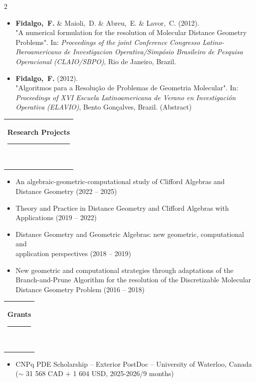 \documentclass[10pt,A4,english]{article}
\newcommand{\mpwidth}{\linewidth-\fboxsep-\fboxsep}
\newcommand{\cvtext}[1] {
	\begin{tabular*}{1\mpwidth}{p{1.05\mpwidth}}
		\parbox{1\mpwidth}{#1}
	\end{tabular*}
}
\newcommand{\cvsection}[1] {
	\vspace{14pt}
	\cvtext{
		\textbf{\LARGE{\textcolor{darkcol}{#1}}}\\[-4pt]
		\textcolor{accentcol}{ \rule{0.2\textwidth}{1.5pt} } \\
	}
}
\begin{document}
\begin{paracol}{2}
\begin{rightcolumn}
\begin{itemize}[leftmargin=*]
%
\\[5pt]
%
\item \textbf{Fidalgo,~F.} \& Maioli,~D. \& Abreu,~E. \& Lavor,~C. (2012). \\ "A numerical formulation for the resolution of Molecular Distance Geometry Problems". In: \textit{Proceedings of the joint Conference Congresso Latino-Iberoamericano de Investigacion Operativa/Simpósio Brasileiro de Pesquisa Operacional (CLAIO/SBPO)}, Rio de Janeiro, Brazil.
%
\\[5pt]
%
\item \textbf{Fidalgo,~F.} (2012). \\ "Algoritmos para a Resolução de Problemas de Geometria Molecular". In: \textit{Proceedings of XVI Escuela Latinoamericana de Verano en Investigación Operativa (ELAVIO)}, Bento Gonçalves, Brazil. (Abstract)
\end{itemize}

\bigskip 

\cvsection{Research Projects}

\begin{itemize}[leftmargin=*]

\item An algebraic-geometric-computational study of Clifford Algebras and \\ Distance Geometry (2022 -- 2025)

\item Theory and Practice in Distance Geometry and Clifford Algebras with \\ Applications (2019 -- 2022)

\item Distance Geometry and Geometric Algebras: new geometric, computational and \\ application perspectives (2018 -- 2019)

\item New geometric and computational strategies through adaptations of the Branch-and-Prune Algorithm for the resolution of the Discretizable Molecular Distance Geometry Problem (2016 -- 2018)

\end{itemize}

\bigskip 

\cvsection{Grants}

\begin{itemize}[leftmargin=*]

\item CNPq PDE Scholarship -- Exterior PostDoc -- University of Waterloo, Canada 
\newline
($\sim$ 31 568 CAD $+$ 1 604 USD, 2025-2026/9 months)


\end{itemize}
\end{rightcolumn}
\end{paracol}
\end{document}
